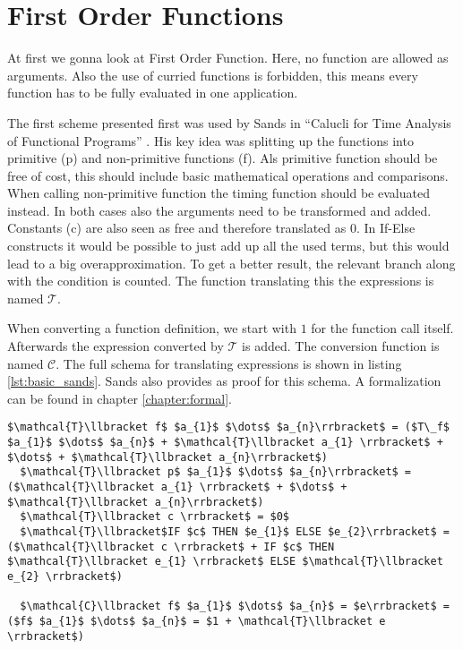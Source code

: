 
\section{First Order Functions}

At first we gonna look at First Order Function.
Here, no function are allowed as arguments.
Also the use of curried functions is forbidden, this means every function has to be fully evaluated in one application.

The first scheme presented first was used by Sands in ``Calucli for Time Analysis of Functional Programs'' \parencite{sands}.
His key idea was splitting up the functions into primitive (p) and non-primitive functions (f).
Als primitive function should be free of cost, this should include basic mathematical operations and comparisons.
When calling non-primitive function the timing function should be evaluated instead.
In both cases also the arguments need to be transformed and added.
Constants (c) are also seen as free and therefore translated as 0.
In If-Else constructs it would be possible to just add up all the used terms,
but this would lead to a big overapproximation.
To get a better result, the relevant branch along with the condition is counted.
The function translating this the expressions is named $\mathcal{T}$.

When converting a function definition, we start with $1$ for the function call itself.
Afterwards the expression converted by $\mathcal{T}$ is added.
The conversion function is named $\mathcal{C}$.
The full schema for translating expressions is shown in listing \ref{lst:basic_sands}.
Sands also provides as proof for this schema. A formalization can be found in chapter \ref{chapter:formal}.

\begin{lstlisting}[label=lst:basic_sands,caption=Translation schema for first order functions by Sands,mathescape=true]
  $\mathcal{T}\llbracket f$ $a_{1}$ $\dots$ $a_{n}\rrbracket$ = ($T\_f$ $a_{1}$ $\dots$ $a_{n}$ + $\mathcal{T}\llbracket a_{1} \rrbracket$ + $\dots$ + $\mathcal{T}\llbracket a_{n}\rrbracket$)
  $\mathcal{T}\llbracket p$ $a_{1}$ $\dots$ $a_{n}\rrbracket$ = ($\mathcal{T}\llbracket a_{1} \rrbracket$ + $\dots$ + $\mathcal{T}\llbracket a_{n}\rrbracket$)
  $\mathcal{T}\llbracket c \rrbracket$ = $0$
  $\mathcal{T}\llbracket$IF $c$ THEN $e_{1}$ ELSE $e_{2}\rrbracket$ = ($\mathcal{T}\llbracket c \rrbracket$ + IF $c$ THEN $\mathcal{T}\llbracket e_{1} \rrbracket$ ELSE $\mathcal{T}\llbracket e_{2} \rrbracket$)

  $\mathcal{C}\llbracket f$ $a_{1}$ $\dots$ $a_{n}$ = $e\rrbracket$ = ($f$ $a_{1}$ $\dots$ $a_{n}$ = $1 + \mathcal{T}\llbracket e \rrbracket$)
\end{lstlisting}

